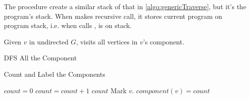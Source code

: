 \observation The procedure create a similar stack of that
in \cref{algo:genericTraverse}, but it's the program's stack.
When  makes recursive call, it stores
current program on program stack, i.e. when 
calls ,  is on stack.


Given $v$ in undirected $G$,  visits
all vertices in $v$'s component.

\begin{algorithm}[H]
    \caption{DFS All the Component}\label{algo:dfsall}
    \begin{algorithmic}[1]
                    \State{}
                \EndIf
            \EndFor
        \EndProcedure
    \end{algorithmic}
\end{algorithm}


\begin{algorithm}[H]
\caption{Count and Label the Components}\label{algo:countlabel}
    \begin{algorithmic}[1]
            \State $count = 0$
                    \State $count = count + 1$
                    \State{}
                \EndIf
            \EndFor
            \Return $count$
        \EndProcedure
            \State Mark $v$.
            \State $component(v) = count$
                    \State{}
                \EndIf
            \EndFor
        \EndProcedure
    \end{algorithmic}
\end{algorithm}

